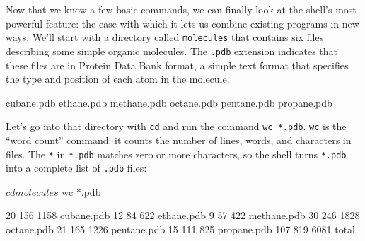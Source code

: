 Now that we know a few basic commands, we can finally look at the
shell's most powerful feature: the ease with which it lets us combine
existing programs in new ways. We'll start with a directory called
\texttt{molecules} that contains six files describing some simple
organic molecules. The \texttt{.pdb} extension indicates that these
files are in Protein Data Bank format, a simple text format that
specifies the type and position of each atom in the molecule.


\begin{VerbOut}
cubane.pdb    ethane.pdb    methane.pdb
octane.pdb    pentane.pdb   propane.pdb
\end{VerbOut}

Let's go into that directory with \texttt{cd} and run the command
\texttt{wc *.pdb}. \texttt{wc} is the ``word count'' command: it counts
the number of lines, words, and characters in files. The \texttt{*} in
\texttt{*.pdb} matches zero or more characters, so the shell turns
\texttt{*.pdb} into a complete list of \texttt{.pdb} files:

\begin{VerbIn}
$ cd molecules
$ wc *.pdb
\end{VerbIn}

\begin{VerbOut}
  20  156 1158 cubane.pdb
  12   84  622 ethane.pdb
   9   57  422 methane.pdb
  30  246 1828 octane.pdb
  21  165 1226 pentane.pdb
  15  111  825 propane.pdb
 107  819 6081 total
\end{VerbOut}

